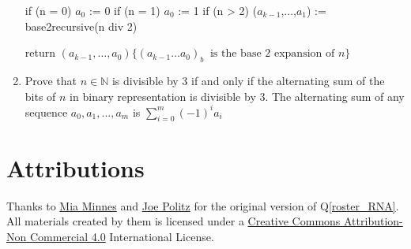 \documentclass[12pt, oneside]{article}
\begin{document}
\begin{enumerate}
\begin{algorithm}[caption={Algorithm: Calculating base $2$ expansion recursively}]
if (n = 0) $a_0$ := 0
if (n = 1) $a_0$ := 1
if (n > 2) {
    ($a_{k-1}$,...,$a_1$) := base2recursive(n div 2)
}

return $(a_{k-1}, \ldots, a_0) \{(a_{k-1} \ldots a_0)_b~\textrm{ is the base } 2 \textrm{ expansion of } n \}$
\end{algorithm}
            
                
                
        \item Prove that $n\in\mathbb{N}$ is divisible by 3 if and only if the alternating sum of the bits of $n$ in binary representation is divisible by 3. The alternating sum of any sequence $a_0, a_1, ..., a_m$ is $\sum_{i=0}^{m} (-1)^i a_i $
            
        \end{enumerate}


\section*{Attributions}
    Thanks to \href{http://cseweb.ucsd.edu/~minnes/}{Mia Minnes} and \href{https://jpolitz.github.io/}{Joe Politz} for the original version of Q\ref{roster_RNA}. All materials created by them is licensed under a \href{http://creativecommons.org/licenses/by-nc/4.0/}{Creative Commons Attribution-Non Commercial 4.0} International License.
\end{document}
